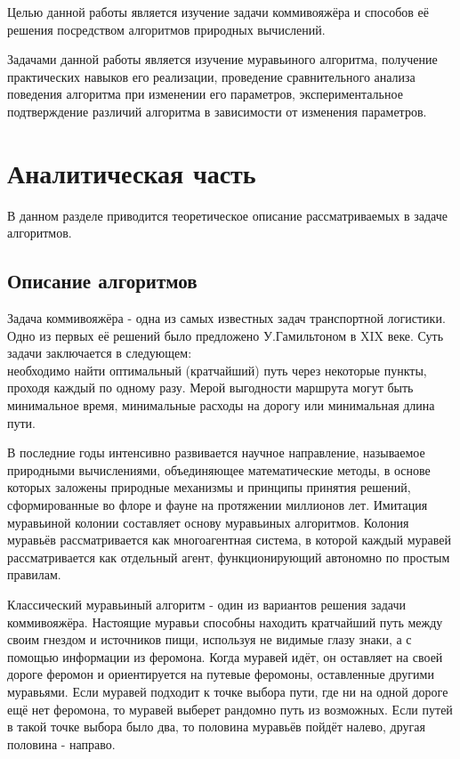 \documentclass[12pt,a4paper]{scrartcl}
\begin{document}
Целью данной работы является изучение задачи коммивояжёра и способов её решения посредством алгоритмов природных вычислений.

Задачами данной работы является изучение муравьиного алгоритма, получение практических навыков его реализации, проведение сравнительного анализа поведения алгоритма при изменении его параметров, экспериментальное подтверждение различий алгоритма в зависимости от изменения параметров.

 \clearpage
\section{Аналитическая часть}

В данном разделе приводится теоретическое описание рассматриваемых в задаче алгоритмов.

\subsection{Описание алгоритмов} 

Задача коммивояжёра - одна из самых известных задач транспортной логистики. Одно из первых её решений было предложено У.Гамильтоном в XIX веке.
Суть задачи заключается в следующем:\\
необходимо найти оптимальный (кратчайший) путь через некоторые пункты, проходя каждый по одному разу. Мерой выгодности маршрута могут быть минимальное время, минимальные расходы на дорогу или минимальная длина пути. \cite{TSP}

В последние годы интенсивно развивается научное направление, называемое природными вычислениями, объединяющее математические методы, в основе которых заложены природные механизмы и принципы принятия решений, сформированные во флоре и фауне на протяжении миллионов лет. Имитация муравьиной колонии составляет основу муравьиных алгоритмов. Колония муравьёв рассматривается как многоагентная система, в которой каждый муравей рассматривается как отдельный агент, функционирующий автономно по простым правилам. \cite{AntAlg}

Классический муравьиный алгоритм - один из вариантов решения задачи коммивояжёра. Настоящие муравьи способны находить кратчайший путь между своим гнездом и источников пищи, используя не видимые глазу знаки, а с помощью информации из феромона. Когда муравей идёт, он оставляет на своей дороге феромон и ориентируется на путевые феромоны, оставленные другими муравьями. Если муравей подходит к точке выбора пути, где ни на одной дороге ещё нет феромона, то муравей выберет рандомно путь из возможных. Если путей в такой точке выбора было два, то половина муравьёв пойдёт налево, другая половина - направо. 
\end{document}
